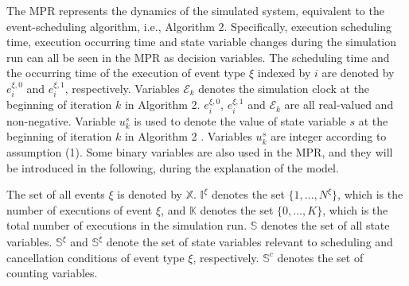 \documentclass[]{interact}
\theoremstyle{plain}%
\theoremstyle{definition}
\theoremstyle{remark}
\begin{document}
The MPR represents the dynamics of the simulated system, equivalent to the event-scheduling algorithm, i.e., Algorithm 2. Specifically, execution scheduling time, execution occurring time and state variable changes during the simulation run can all be seen in the MPR as decision variables. The scheduling time and the occurring time of the execution of event type $\xi$ indexed by $i$ are denoted by $e^{\xi,0}_{i}$ and $e^{\xi,1}_{i}$, respectively. Variables $\mathcal{E}_k$ denotes the simulation clock at the beginning of iteration $k$ in Algorithm 2. 
$e^{\xi,0}_{i}$, $e^{\xi,1}_{i}$ and $\mathcal{E}_k$ are all real-valued and non-negative. Variable $u^s_k$ is used to denote the value of state variable $s$ at the beginning of iteration $k$ in Algorithm 2%
. Variables $u^s_k$ are integer according to assumption (1). Some binary variables are also used in the MPR, and they will be introduced in the following, during the explanation of the model. 

The set of all events $\xi$ is denoted by $\mathbb{X}$. $\mathbb{I}^{\xi}$ denotes the set $\{1,...,N^{\xi}\}$, which is the number of executions of event ${\xi}$, and $\mathbb{K}$ denotes the set $\{0,...,K\}$, which is the total number of executions in the simulation run. $\mathbb{S}$ denotes the set of all state variables. $\mathbb{S}^{\xi}$ and $\mathbb{S}^{\bar{\xi}}$ denote the set of state variables relevant to scheduling and cancellation conditions of event type ${\xi}$, respectively. $\mathbb{S}^{c}$ denotes the set of counting variables.
\end{document}
